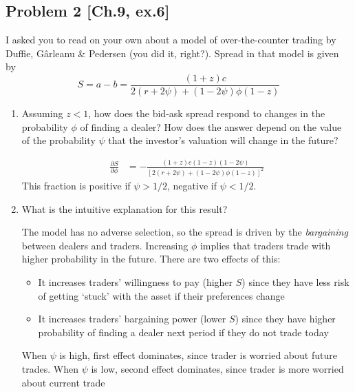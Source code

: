 \documentclass[11pt
, answers
]{exam}
\begin{document}
\quad
\subsection*{Problem 2 [Ch.9, ex.6]}

I asked you to read on your own about a model of over-the-counter trading by Duffie, G{\^a}rleanu \& Pedersen (you did it, right?). Spread in that model is given by
\[
S=a-b=\frac{(1+z)c}{2(r+2\psi)+(1-2\psi)\phi(1-z)}
\]
\begin{enumerate}[label=(\alph*). ]
	\item Assuming $z<1$, how does the bid-ask spread respond to changes in the probability $\phi$ of finding a dealer? How does the answer depend on the value of the probability $\psi$ that the investor's valuation will change in the future?
	
	\begin{solution}
		\begin{align*}
			\frac{\partial S}{\partial \phi} & = -\frac{(1+z)c(1-z)(1-2\psi)}{[2(r+2\psi)+(1-2\psi)\phi(1-z)]^2}
		\end{align*}
		This fraction is positive if $\psi>1/2$, negative if $\psi<1/2$.
	\end{solution}
	
	
	\item What is the intuitive explanation for this result?
	
	\begin{solution}
		 The model has no adverse selection, so the spread is driven by the \textit{bargaining} between dealers and traders. Increasing $\phi$ implies that traders trade with higher probability in the future. There are two effects of this:
		\begin{itemize}
			\item It increases traders' willingness to pay (higher $S$) since they have less risk of getting `stuck' with the asset if their preferences change
			\item It increases traders' bargaining power (lower $S$) since they have higher probability of finding a dealer next period if they do not trade today
		\end{itemize}
		When $\psi$ is high, first effect dominates, since trader is worried about future trades. When $\psi$ is low, second effect dominates, since trader is more worried about current trade
	\end{solution}
\end{enumerate}
\end{document}
